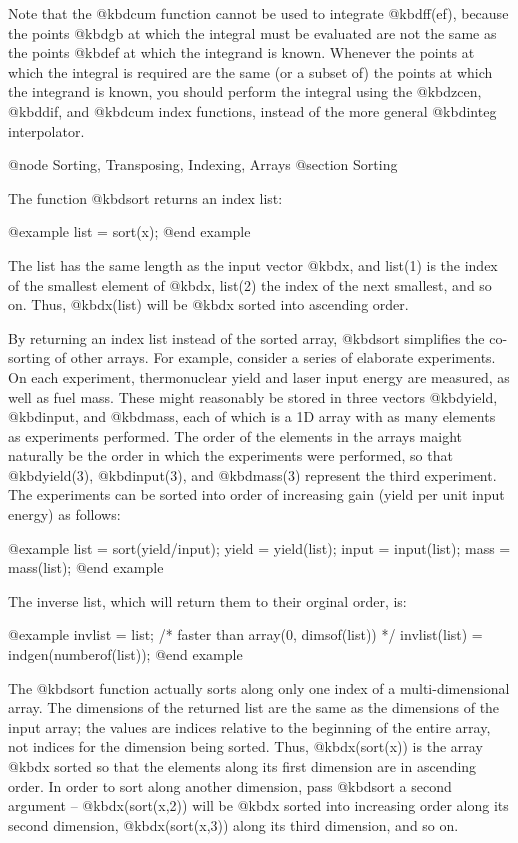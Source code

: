 Note that the @kbd{cum} function cannot be used to integrate
@kbd{ff(ef)}, because the points @kbd{gb} at which the integral must be
evaluated are not the same as the points @kbd{ef} at which the integrand
is known.  Whenever the points at which the integral is required are the
same (or a subset of) the points at which the integrand is known, you
should perform the integral using the @kbd{zcen}, @kbd{dif}, and
@kbd{cum} index functions, instead of the more general @kbd{integ}
interpolator.




@node    Sorting, Transposing, Indexing, Arrays
@section Sorting

The function @kbd{sort} returns an index list:

@example
list = sort(x);
@end example

The list has the same length as the input vector @kbd{x}, and list(1) is
the index of the smallest element of @kbd{x}, list(2) the index of the
next smallest, and so on.  Thus, @kbd{x(list)} will be @kbd{x} sorted
into ascending order.

By returning an index list instead of the sorted array, @kbd{sort}
simplifies the co-sorting of other arrays.  For example, consider a
series of elaborate experiments.  On each experiment, thermonuclear
yield and laser input energy are measured, as well as fuel mass.  These
might reasonably be stored in three vectors @kbd{yield}, @kbd{input},
and @kbd{mass}, each of which is a 1D array with as many elements as
experiments performed.  The order of the elements in the arrays maight
naturally be the order in which the experiments were performed, so that
@kbd{yield(3)}, @kbd{input(3)}, and @kbd{mass(3)} represent the third
experiment.  The experiments can be sorted into order of increasing
gain (yield per unit input energy) as follows:

@example
list = sort(yield/input);
yield = yield(list);
input = input(list);
mass = mass(list);
@end example

The inverse list, which will return them to their orginal order, is:

@example
invlist = list;  /* faster than  array(0, dimsof(list)) */
invlist(list) = indgen(numberof(list));
@end example

The @kbd{sort} function actually sorts along only one index of a
multi-dimensional array.  The dimensions of the returned list are the
same as the dimensions of the input array; the values are indices
relative to the beginning of the entire array, not indices for the
dimension being sorted.  Thus, @kbd{x(sort(x))} is the array @kbd{x}
sorted so that the elements along its first dimension are in ascending
order.  In order to sort along another dimension, pass @kbd{sort} a
second argument -- @kbd{x(sort(x,2))} will be @kbd{x} sorted into
increasing order along its second dimension, @kbd{x(sort(x,3))} along
its third dimension, and so on.

